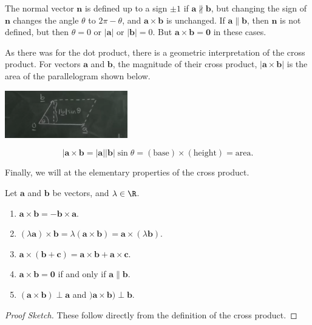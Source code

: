 \documentclass[a4]{scrreprt}
\begin{document}
\begin{remark}
	The normal vector $\mathbf{n}$ is defined up to a sign $\pm 1$ if $\mathbf{a} \not \parallel \mathbf{b}$, but changing the sign of $\mathbf{n}$ changes the angle $\theta$ to $2 \pi - \theta$, and $\mathbf{a} \times \mathbf{b}$ is unchanged. If $\mathbf{a} \parallel \mathbf{b}$, then $\mathbf{n}$ is not defined, but then $\theta = 0$ or $|\mathbf{a}|$ or $|\mathbf{b}| = 0$. But $\mathbf{a} \times \mathbf{b} = \mathbf{0}$ in these cases.
\end{remark}

As there was for the dot product, there is a geometric interpretation of the cross product.
For vectors $\mathbf{a}$ and $\mathbf{b}$, the magnitude of their cross product, $|\mathbf{a} \times \mathbf{b}|$ is the area of the parallelogram shown below.
\begin{center}
	\includegraphics[width=0.4\textwidth]{cross_product_area.png}
\end{center}
$$
|\mathbf{a} \times \mathbf{b} = |\mathbf{a}| |\mathbf{b}| \sin \theta = (\text{base})\times(\text{height}) = \text{area}.
$$

Finally, we will at the elementary properties of the cross product.

\begin{proposition}
	Let $\mathbf{a}$ and $\mathbf{b}$ be vectors, and $\lambda \in \R$.
	\begin{enumerate}[label=(\roman*)]
		\item $\mathbf{a} \times \mathbf{b} = - \mathbf{b} \times \mathbf{a}$.
		\item $(\lambda \mathbf{a}) \times \mathbf{b} = \lambda(\mathbf{a} \times \mathbf{b}) = \mathbf{a} \times (\lambda \mathbf{b})$.
		\item $\mathbf{a} \times (\mathbf{b} + \mathbf{c}) = \mathbf{a} \times \mathbf{b} + \mathbf{a} \times \mathbf{c}$.
		\item $\mathbf{a} \times \mathbf{b} = \mathbf{0}$ if and only if $\mathbf{a} \parallel \mathbf{b}$.
		\item $(\mathbf{a} \times \mathbf{b}) \perp \mathbf{a}$ and $)\mathbf{a} \times \mathbf{b}) \perp \mathbf{b}$.
	\end{enumerate}
\end{proposition}
\begin{proof}[Proof Sketch]
	These follow directly from the definition of the cross product.
\end{proof}
\end{document}
